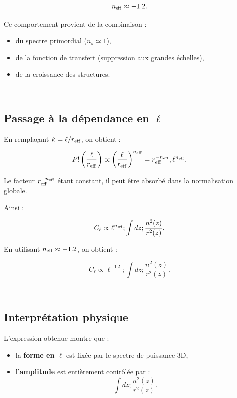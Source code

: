 \documentclass[a4paper,11pt]{article}
\begin{document}
\begin{equation}
n_{\rm eff} \approx -1.2.
\end{equation}

Ce comportement provient de la combinaison :
\begin{itemize}
\item du spectre primordial ($n_s \simeq 1$),
\item de la fonction de transfert (suppression aux grandes échelles),
\item de la croissance des structures.
\end{itemize}

---

\subsection{Passage à la dépendance en $\ell$}

En remplaçant $k = \ell / r_{\rm eff}$, on obtient :

\begin{equation}
P!\left(\frac{\ell}{r_{\rm eff}}\right)
\propto \left(\frac{\ell}{r_{\rm eff}}\right)^{n_{\rm eff}}
= r_{\rm eff}^{-n_{\rm eff}} , \ell^{n_{\rm eff}}.
\end{equation}

Le facteur $r_{\rm eff}^{-n_{\rm eff}}$ étant constant, il peut être absorbé dans la normalisation globale.

Ainsi :

\begin{equation}
C_\ell \propto \ell^{n_{\rm eff}} ;
\int dz ; \frac{n^2(z)}{r^2(z)}.
\end{equation}

En utilisant $n_{\rm eff} \approx -1.2$, on obtient :

\begin{equation}
C_\ell \propto \ell^{-1.2} ;
\int dz ; \frac{n^2(z)}{r^2(z)}.
\end{equation}

---

\subsection{Interprétation physique}

L'expression obtenue montre que :

\begin{itemize}
\item la \textbf{forme en $\ell$} est fixée par le spectre de puissance 3D,
\item l'\textbf{amplitude} est entièrement contrôlée par :
\begin{equation}
\int dz ; \frac{n^2(z)}{r^2(z)}.
\end{equation}
\end{itemize}
\end{document}
